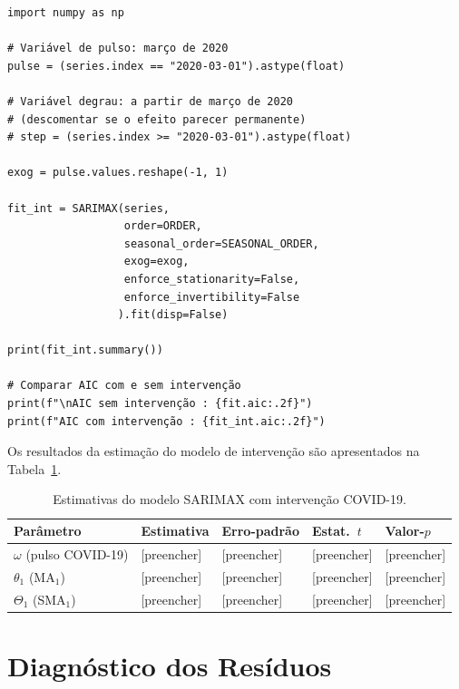\documentclass[12pt, a4paper]{article}
\begin{document}
\begin{lstlisting}[caption={Modelo SARIMAX com variável de intervenção COVID-19.},
                   label={lst:intervencao}]
import numpy as np

# Variável de pulso: março de 2020
pulse = (series.index == "2020-03-01").astype(float)

# Variável degrau: a partir de março de 2020
# (descomentar se o efeito parecer permanente)
# step = (series.index >= "2020-03-01").astype(float)

exog = pulse.values.reshape(-1, 1)

fit_int = SARIMAX(series,
                  order=ORDER,
                  seasonal_order=SEASONAL_ORDER,
                  exog=exog,
                  enforce_stationarity=False,
                  enforce_invertibility=False
                 ).fit(disp=False)

print(fit_int.summary())

# Comparar AIC com e sem intervenção
print(f"\nAIC sem intervenção : {fit.aic:.2f}")
print(f"AIC com intervenção : {fit_int.aic:.2f}")
\end{lstlisting}

Os resultados da estimação do modelo de intervenção são apresentados na
Tabela~\ref{tab:intervencao}.

\begin{table}[H]
  \centering
  \caption{Estimativas do modelo SARIMAX com intervenção COVID-19.}
  \label{tab:intervencao}
  \begin{tabularx}{\textwidth}{lXXXX}
    \toprule
    \textbf{Parâmetro} & \textbf{Estimativa} & \textbf{Erro-padrão}
      & \textbf{Estat.\ $t$} & \textbf{Valor-$p$} \\
    \midrule
    $\omega$ (pulso COVID-19) & [preencher] & [preencher]
      & [preencher] & [preencher] \\
    $\theta_1$ (MA$_1$)       & [preencher] & [preencher]
      & [preencher] & [preencher] \\
    $\Theta_1$ (SMA$_1$)      & [preencher] & [preencher]
      & [preencher] & [preencher] \\
    \bottomrule
  \end{tabularx}
\end{table}

\section{Diagnóstico dos Resíduos}
\label{sec:diagnostico}
\end{document}

